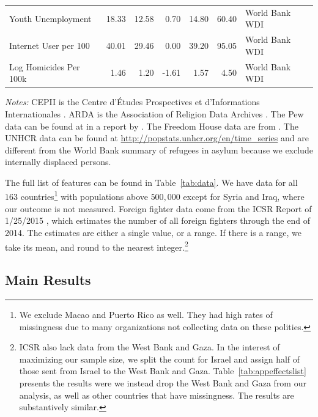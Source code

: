 \documentclass[12pt]{article}
\begin{document}
\begin{table}[!h]
\begin{tabular}{lrrrrrl}
	Youth Unemployment & 18.33 & 12.58 & 0.70 & 14.80 & 60.40 & World Bank WDI \\ 
	Internet User per 100 & 40.01 & 29.46 & 0.00 & 39.20 & 95.05 & World Bank WDI \\ 
	Log Homicides Per 100k & 1.46 & 1.20 & -1.61 & 1.57 & 4.50 & World Bank WDI \\ 
	\bottomrule
\end{tabular}
\begin{flushleft} \footnotesize \textit{Notes:} CEPII is the Centre d'\'{E}tudes Prospectives et d'Informations Internationales \citep{Mayer2011}. ARDA is the Association of Religion Data Archives \citep{Finke2010}. The Pew data can be found at in a report by \cite{Grim2012}. The Freedom House data are from \cite{Teorell2013}. The UNHCR data can be found at \href{http://popstats.unhcr.org/en/time\_series}{http://popstats.unhcr.org/en/time\_series} and are different from the World Bank summary of refugees in asylum because we exclude internally displaced persons. \end{flushleft}
\end{table}


The full list of features can be found in Table~\ref{tab:data}. We have data for all $163$ countries\footnote{We exclude Macao and Puerto Rico as well. They had high rates of missingness due to many organizations not collecting data on these polities.} with populations above $500,000$ except for Syria and Iraq, where our outcome is not measured. Foreign fighter data come from the ICSR Report of 1/25/2015 \citep{Neumann2015}, which estimates the number of all foreign fighters through the end of 2014. The estimates are either a single value, or a range. If there is a range, we take its mean, and round to the nearest integer.\footnote{ICSR also lack data from the West Bank and Gaza. In the interest of maximizing our sample size, we split the count for Israel and assign half of those sent from Israel to the West Bank and Gaza. Table~\ref{tab:appeffectslist} presents the results were we instead drop the West Bank and Gaza from our analysis, as well as other countries that have missingness. The results are substantively similar.} \\

\subsection{Main Results}
\end{document}
